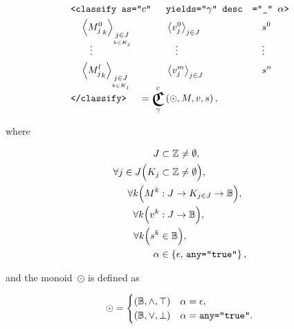 \begin{axiom}
\begin{alignat}{3}
    &\xml{<classify as="$c$" }&&\xml{yields="$\gamma$" desc}&&\xml{="$\_$"
          $\alpha$>}\label{eq:xml-classify} \\
    &\quad \MFam{M^0}jJkK   &&\VFam{v^0}jJ   &&\quad s^0    \nonumber\\[-4mm]
    &\quad \quad\vdots      &&\quad\vdots    &&\quad \vdots \nonumber\\
    &\quad \MFam{M^l}jJkK   &&\VFam{v^m}jJ   &&\quad s^n    \nonumber\\[-3mm]
    &\xml{</classify>}
      &&\mspace{-50mu}= \Classify^c_\gamma\left(\odot,M,v,s\right), \nonumber
\end{alignat}

\noindent
where

\begin{align}
    J &\subset\mathbb{Z} \neq\emptyset, \\
    \forall{j\in J}\Big(K_j &\subset\mathbb{Z} \neq\emptyset\Big), \\
    \forall{k}\Big(M^k &: J \rightarrow K_{j\in J} \rightarrow \mathbb{B}\Big),
                                            \label{eq:class-matrix} \\
    \forall{k}\Big(v^k &: J \rightarrow \mathbb{B}\Big), \\
    \forall{k}\Big(s^k &\in\mathbb{B}\Big), \\
    \alpha &\in\left\{\epsilon,\, \texttt{any="true"}\right\}, \label{eq:xml-any-domain}
\end{align}

\noindent
and the monoid~$\odot$ is defined as

\begin{equation}\label{eq:classify-rel}
  \odot = \begin{cases}
        \left({\mathbb{B}},{\land},{\top}\right) &\alpha = \epsilon,\\
        \left({\mathbb{B}},{\lor},{\bot}\right) &\alpha = \texttt{any="true"}.
      \end{cases}
\end{equation}
\end{axiom}


